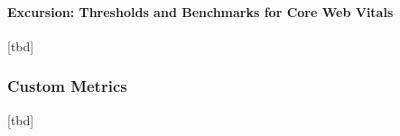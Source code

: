 









\paragraph{Excursion: Thresholds and Benchmarks for Core Web Vitals}


[tbd]




































\subsubsection{Custom Metrics}


[tbd]



